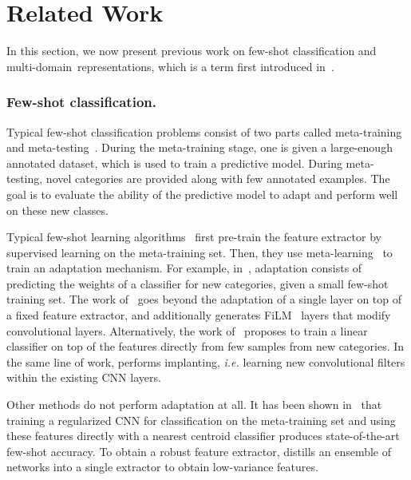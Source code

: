 \documentclass[runningheads]{llncs}
\begin{document}
\section{Related Work}
In this section, we now present previous work on few-shot classification and
multi-domain~representations, which is a term first introduced in~\cite{bilen2017universal}.

\subsubsection{Few-shot classification.}
Typical few-shot classification problems consist of two parts called
meta-training and meta-testing~\cite{chen19closerfewshot}. During the
meta-training stage, one is given a large-enough annotated dataset, which is
used to train a predictive model. During meta-testing, novel categories are
provided along with few annotated examples. The goal is to evaluate the ability
of the predictive model to adapt and perform well on these new classes.

Typical few-shot learning
algorithms~\cite{gidaris2019boosting,gidaris2018dynamic,qiao2018few} first
pre-train the feature extractor by supervised learning on the
meta-training set. Then, they use
meta-learning~\cite{schmidhuber1997shifting,thrun1998lifelong} to train an
adaptation mechanism. 
For example, in~\cite{gidaris2018dynamic,qiao2018few}, adaptation consists of
predicting the weights of a classifier for new categories,
given a small few-shot
training set. 
The work of~\cite{oreshkin2018tadam} goes beyond
the adaptation of a single layer on top of a fixed feature extractor, and additionally
generates FiLM~\cite{perez2018film} layers that modify convolutional layers.
Alternatively, the work of~\cite{chen19closerfewshot} proposes to train a linear
classifier on top of the features directly from few samples from new categories.
In the same line of work, \cite{lifchitz2019dense} performs implanting, \textit{i.e.}
learning new convolutional filters within the existing CNN
layers.

Other methods do not perform adaptation at all. It has been
shown in~\cite{dvornik2019diversity,lifchitz2019dense,saikia2020optimized} that
training a regularized CNN for classification on the meta-training set
and using these features directly with a nearest centroid classifier produces
state-of-the-art few-shot accuracy. To obtain a robust feature extractor,
\cite{dvornik2019diversity} distills an ensemble of networks into a single extractor
to obtain low-variance features. 
\end{document}
